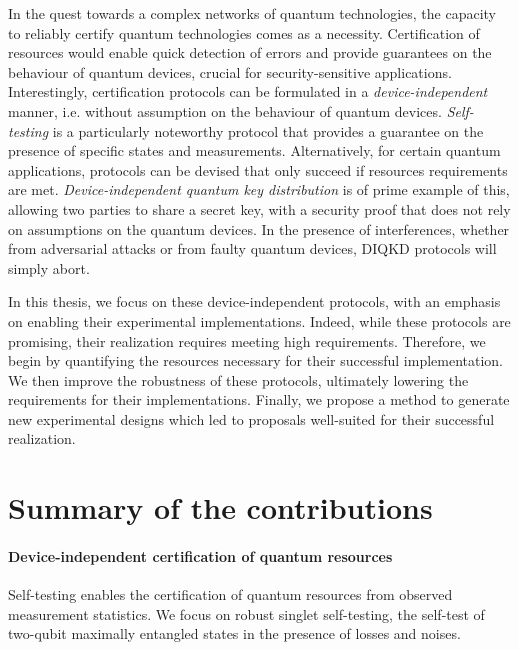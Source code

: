 \medbreak

In the quest towards a complex networks of quantum technologies, the capacity to reliably certify quantum technologies comes as a necessity.
Certification of resources would enable quick detection of errors and provide guarantees on the behaviour of quantum devices, crucial for security-sensitive applications.
Interestingly, certification protocols can be formulated in a \textit{device-independent} manner, i.e. without assumption on the behaviour of quantum devices. 
\textit{Self-testing} is a particularly noteworthy protocol that provides a guarantee on the presence of specific states and measurements.
Alternatively, for certain quantum applications, protocols can be devised that only succeed if resources requirements are met.
\textit{Device-independent quantum key distribution} is of prime example of this, allowing two parties to share a secret key, with a security proof that does not rely on assumptions on the quantum devices.
In the presence of interferences, whether from adversarial attacks or from faulty quantum devices, DIQKD protocols will simply abort.

\medbreak

In this thesis, we focus on these device-independent protocols, with an emphasis on enabling their experimental implementations.
Indeed, while these protocols are promising, their realization requires meeting high requirements.
Therefore, we begin by quantifying the resources necessary for their successful implementation.
We then improve the robustness of these protocols, ultimately lowering the requirements for their implementations.
Finally, we propose a method to generate new experimental designs which led to proposals well-suited for their successful realization.

\section{Summary of the contributions}

\paragraph{Device-independent certification of quantum resources} 

Self-testing enables the certification of quantum resources from observed measurement statistics.
We focus on robust singlet self-testing, the self-test of two-qubit maximally entangled states in the presence of losses and noises.

